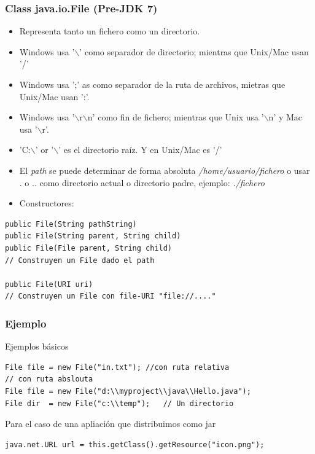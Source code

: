\documentclass{beamer}
\begin{document}
\begin{frame}[fragile]
\frametitle{Class java.io.File (Pre-JDK 7)}
\begin{itemize}[<+->]
\item Representa tanto un fichero como un directorio.
\item Windows usa '\alert{$\backslash$}' como separador de directorio; mientras que  Unix/Mac usan '\alert{/}'
\item Windows usa  '\alert{;}' as como separador de la ruta de archivos, mietras que Unix/Mac usan '\alert{:}'.
\item Windows usa '\alert{$\backslash$r$\backslash$n}' como fin de fichero; mientras que  Unix usa '\alert{$\backslash$n}'  y Mac usa '\alert{$\backslash$r}'.
\item '\alert{C:$\backslash$}' or '\alert{$\backslash$}' es el directorio raíz. Y en Unix/Mac es '\alert{/}'
\item El \emph{path} se puede determinar de forma absoluta \emph{/home/usuario/fichero} o usar \alert{.} o \alert{..} como directorio actual o directorio padre, ejemplo: \emph{./fichero}
\item Constructores:
\end{itemize}
\pause
\begin{footnotesize}
\begin{verbatim}
public File(String pathString)
public File(String parent, String child)
public File(File parent, String child)
// Construyen un File dado el path
  
public File(URI uri)
// Construyen un File con file-URI "file://...."
\end{verbatim}
\end{footnotesize}
\end{frame}



\begin{frame}[fragile]
\frametitle{Ejemplo}
\begin{footnotesize}
\begin{block}{Ejemplos básicos}
\begin{verbatim}
File file = new File("in.txt"); //con ruta relativa
// con ruta abslouta
File file = new File("d:\\myproject\\java\\Hello.java");  
File dir  = new File("c:\\temp");   // Un directorio
\end{verbatim}
\end{block} 
\pause
\begin{block}{Para el caso de una apliación que distribuimos como jar}
\begin{verbatim}
java.net.URL url = this.getClass().getResource("icon.png");
\end{verbatim}
\end{block} 
\end{footnotesize}
\end{frame}
\end{document}

